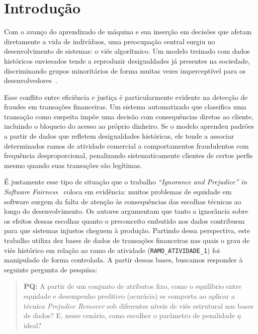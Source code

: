 \section{Introdução}
\label{sec:introducao}

Com o avanço do aprendizado de máquina e sua inserção em decisões que afetam diretamente a vida de indivíduos, uma preocupação central surgiu no desenvolvimento de sistemas: o viés algorítmico. Um modelo treinado com dados históricos enviesados tende a reproduzir desigualdades já presentes na sociedade, discriminando grupos minoritários de forma muitas vezes imperceptível para os desenvolvedores~\cite{barocas2016big}. 

Esse conflito entre eficiência e justiça é particularmente evidente na detecção de fraudes em transações financeiras. Um sistema automatizado que classifica uma transação como suspeita impõe uma decisão com consequências diretas ao cliente, incluindo o bloqueio do acesso ao próprio dinheiro. Se o modelo aprendeu padrões a partir de dados que refletem desigualdades históricas, ele tende a associar determinados ramos de atividade comercial a comportamentos fraudulentos com frequência desproporcional, penalizando sistematicamente clientes de certos perfis mesmo quando suas transações são legítimas.

É justamente esse tipo de situação que o trabalho \textit{``Ignorance and Prejudice'' in Software Fairness}~\cite{zhang2021ignorance} coloca em evidência: muitos problemas de equidade em software surgem da falta de atenção às consequências das escolhas técnicas ao longo do desenvolvimento. Os autores argumentam que tanto a ignorância sobre os efeitos dessas escolhas quanto o preconceito embutido nos dados contribuem para que sistemas injustos cheguem à produção. Partindo dessa perspectiva, este trabalho utiliza dez bases de dados de transações financeiras nas quais o grau de viés histórico em relação ao ramo de atividade (\texttt{RAMO\_ATIVIDADE\_1}) foi manipulado de forma controlada. A partir dessas bases, buscamos responder à seguinte pergunta de pesquisa:

\begin{quote}
\textbf{PQ:} A partir de um conjunto de atributos fixo, como o equilíbrio entre equidade e desempenho preditivo (acurácia) se comporta ao aplicar a técnica \textit{Prejudice Remover} sob diferentes níveis de viés estrutural nas bases de dados? E, nesse cenário, como escolher o parâmetro de penalidade $\eta$ ideal?
\end{quote}

